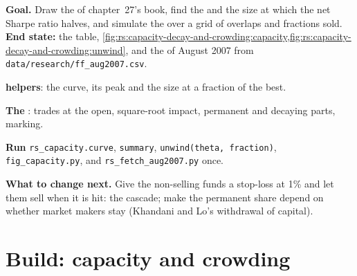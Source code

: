 \begin{tutorial}
\textbf{Goal.} Draw the  of chapter~27's book, find the  and the size at which the net Sharpe ratio halves, and simulate
the  over a grid of overlaps and fractions sold. \textbf{End state:} the table, \cref{fig:rs:capacity-decay-and-crowding:capacity,fig:rs:capacity-decay-and-crowding:unwind},
and the  of August 2007 from \texttt{data/research/ff\_aug2007.csv}.
\begin{tutsteps}
\item \textbf{ helpers}: the curve, its peak and the size at a fraction of the best.
\label{lst:rs:capacity-decay-and-crowding:curve}
\item \textbf{The }: trades at the open, square-root impact, permanent and decaying parts, marking.
\label{lst:rs:capacity-decay-and-crowding:unwind}
\item \textbf{Run} \texttt{rs\_capacity.curve}, \texttt{summary}, \texttt{unwind(theta, fraction)}, \texttt{fig\_capacity.py}, and \texttt{rs\_fetch\_aug2007.py} once.
\end{tutsteps}
\textbf{What to change next.} Give the non-selling funds a stop-loss at 1\% and let them sell when it is hit: the cascade; make the permanent share depend on
whether market makers stay (Khandani and Lo's withdrawal of capital).
\end{tutorial}

\section{Build: capacity and crowding}\label{bld:rs:capacity-decay-and-crowding:capacity}

